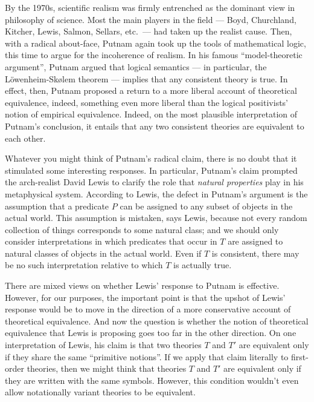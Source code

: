 By the 1970s, scientific realism was firmly entrenched as the dominant
view in philosophy of science.  Most the main players in the field ---
Boyd, Churchland, Kitcher, Lewis, Salmon, Sellars, etc.\ --- had taken
up the realist cause.  Then, with a radical about-face, Putnam again
took up the tools of mathematical logic, this time to argue for the
incoherence of realism.  In his famous ``model-theoretic argument'',
Putnam argued that logical semantics --- in particular, the
L\"owenheim-Sk{\o}lem theorem --- implies that any consistent theory
is true.  In effect, then, Putnam proposed a return to a more liberal
account of theoretical equivalence, indeed, something even more
liberal than the logical positivists' notion of empirical equivalence.
Indeed, on the most plausible interpretation of Putnam's conclusion,
it entails that any two consistent theories are equivalent to each
other.

Whatever you might think of Putnam's radical claim, there is no doubt
that it stimulated some interesting responses.  In particular,
Putnam's claim prompted the arch-realist David Lewis to clarify the
role that {\it natural properties} play in his metaphysical system.
According to Lewis, the defect in Putnam's argument is the assumption
that a predicate $P$ can be assigned to any subset of objects in the
actual world.  This assumption is mistaken, says Lewis, because not
every random collection of things corresponds to some natural class;
and we should only consider interpretations in which predicates that
occur in $T$ are assigned to natural classes of objects in the actual
world.  Even if $T$ is consistent, there may be no such interpretation
relative to which $T$ is actually true.

There are mixed views on whether Lewis' response to Putnam is
effective.  However, for our purposes, the important point is that the
upshot of Lewis' response would be to move in the direction of a more
conservative account of theoretical equivalence.  And now the question
is whether the notion of theoretical equivalence that Lewis is
proposing goes too far in the other direction.  On one interpretation
of Lewis, his claim is that two theories $T$ and $T'$ are equivalent
only if they share the same ``primitive notions''.  If we apply that
claim literally to first-order theories, then we might think that
theories $T$ and $T'$ are equivalent only if they are written with the
same symbols.  However, this condition wouldn't even allow
notationally variant theories to be equivalent.

